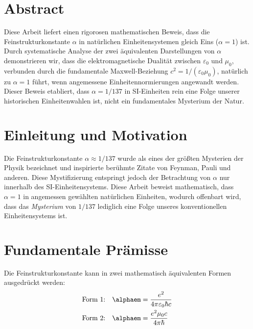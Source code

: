 \section*{Abstract}
		Diese Arbeit liefert einen rigorosen mathematischen Beweis, dass die Feinstrukturkonstante $\alpha$ in natürlichen Einheitensystemen gleich Eins ($\alpha = 1$) ist. Durch systematische Analyse der zwei äquivalenten Darstellungen von $\alpha$ demonstrieren wir, dass die elektromagnetische Dualität zwischen $\varepsilon_0$ und $\mu_0$, verbunden durch die fundamentale Maxwell-Beziehung $c^2 = 1/(\varepsilon_0\mu_0)$, natürlich zu $\alpha = 1$ führt, wenn angemessene Einheitennormierungen angewandt werden. Dieser Beweis etabliert, dass $\alpha = 1/137$ in SI-Einheiten rein eine Folge unserer historischen Einheitenwahlen ist, nicht ein fundamentales Mysterium der Natur.

	
	
	\section{Einleitung und Motivation}
	
	Die Feinstrukturkonstante $\alpha \approx 1/137$ wurde als eines der größten Mysterien der Physik bezeichnet und inspirierte berühmte Zitate von Feynman, Pauli und anderen. Diese Mystifizierung entspringt jedoch der Betrachtung von $\alpha$ nur innerhalb des SI-Einheitensystems. Diese Arbeit beweist mathematisch, dass $\alpha = 1$ in angemessen gewählten natürlichen Einheiten, wodurch offenbart wird, dass das \textit{Mysterium} von $1/137$ lediglich eine Folge unseres konventionellen Einheitensystems ist.
	
	\section{Fundamentale Prämisse}
	
	\begin{definition}
		Die Feinstrukturkonstante kann in zwei mathematisch äquivalenten Formen ausgedrückt werden:
		\begin{align}
			\text{Form 1:} \quad \alphaem &= \frac{e^2}{4\pi\varepsilon_0\hbar c} \label{eq:alpha_form1}\\
			\text{Form 2:} \quad \alphaem &= \frac{e^2 \mu_0 c}{4\pi \hbar} \label{eq:alpha_form2}
		\end{align}
	\end{definition}
	
